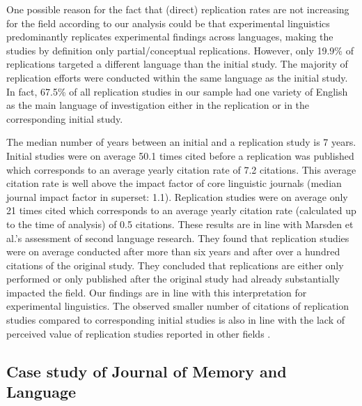 \documentclass[cm,linguex]{glossa}
\begin{document}
One possible reason for the fact that (direct) replication rates are not increasing for the field according to our analysis could be that experimental linguistics predominantly replicates experimental findings across languages, making the studies by definition only partial/conceptual replications.
However, only 19.9\% of replications targeted a different language than the initial study.
The majority of replication efforts were conducted within the same language as the initial study.
In fact, 67.5\% of all replication studies in our sample had one variety of English as the main language of investigation either in the replication or in the corresponding initial study.

The median number of years between an initial and a replication study is 7 years.
Initial studies were on average 50.1 times cited before a replication was published which corresponds to an average yearly citation rate of 7.2 citations.
This average citation rate is well above the impact factor of core linguistic journals (median journal impact factor in superset: 1.1).
Replication studies were on average only 21 times cited which corresponds to an average yearly citation rate (calculated up to the time of analysis) of 0.5 citations. These results are in line with Marsden et al.'s \citeyearpar{marsden_replication_2018} assessment of second language research. They found that replication studies were on average conducted after more than six years and after over a hundred citations of the original study. They concluded that replications are either only performed or only published after the original study had already substantially impacted the field. Our findings are in line with this interpretation for experimental linguistics.
The observed smaller number of citations of replication studies compared to corresponding initial studies is also in line with the lack of perceived value of replication studies reported in other fields \citep[e.g.,][]{koole_rewarding_2012, nosek_scientific_2012}.

\hypertarget{case-study-of-journal-of-memory-and-language}{%
\subsection{Case study of Journal of Memory and Language}\label{case-study-of-journal-of-memory-and-language}}
\end{document}
